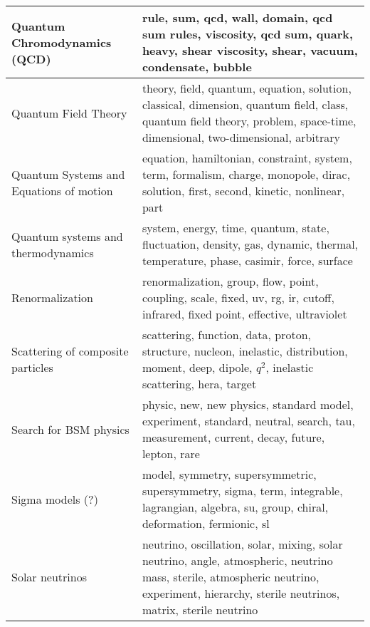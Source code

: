 \begin{longtable}[H]{p{}|p{}}
Quantum Chromodynamics (QCD)                          &                                                                          rule, sum, qcd, wall, domain, qcd sum rules, viscosity, qcd sum, quark, heavy, shear viscosity, shear, vacuum, condensate, bubble \\ \midrule
Quantum Field Theory                                  &                                 theory, field, quantum, equation, solution, classical, dimension, quantum field, class, quantum field theory, problem, space-time, dimensional, two-dimensional, arbitrary \\ \midrule
Quantum Systems and Equations of motion               &                                                                     equation, hamiltonian, constraint, system, term, formalism, charge, monopole, dirac, solution, first, second, kinetic, nonlinear, part \\ \midrule
Quantum systems and thermodynamics                    &                                                                             system, energy, time, quantum, state, fluctuation, density, gas, dynamic, thermal, temperature, phase, casimir, force, surface \\ \midrule
Renormalization                                       &                                                                             renormalization, group, flow, point, coupling, scale, fixed, uv, rg, ir, cutoff, infrared, fixed point, effective, ultraviolet \\ \midrule
Scattering of composite particles                     &                                                           scattering, function, data, proton, structure, nucleon, inelastic, distribution, moment, deep, dipole, $q^2$, inelastic scattering, hera, target \\ \midrule
Search for BSM physics                                &                                                                    physic, new, new physics, standard model, experiment, standard, neutral, search, tau, measurement, current, decay, future, lepton, rare \\ \midrule
Sigma models (?)                                      &                                                                model, symmetry, supersymmetric, supersymmetry, sigma, term, integrable, lagrangian, algebra, su, group, chiral, deformation, fermionic, sl \\ \midrule
Solar neutrinos                                       &                 neutrino, oscillation, solar, mixing, solar neutrino, angle, atmospheric, neutrino mass, sterile, atmospheric neutrino, experiment, hierarchy, sterile neutrinos, matrix, sterile neutrino \\ \midrule

\end{longtable}
